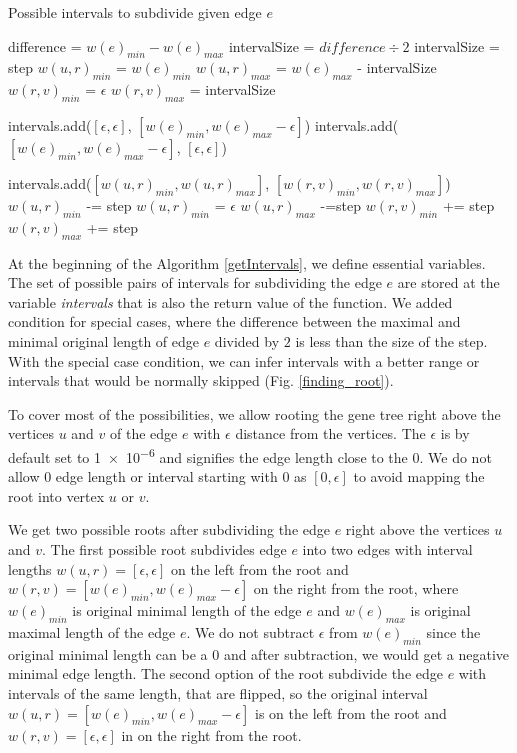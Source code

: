 \begin{algorithm}
\caption{Possible intervals to subdivide given edge $e$} 
\label{getIntervals}
\begin{algorithmic}[1]
	\State difference = $w(e)_{min} - w(e)_{max}$
		\State intervalSize = $difference \div 2$
	\Else
		\State intervalSize = step
	\EndIf
	\State $w(u,r)_{min}$ = $w(e)_{min}$
	\State $w(u,r)_{max}$ = $w(e)_{max}$ - intervalSize
	\State $w(r,v)_{min}$ = $\epsilon$
	\State $w(r,v)_{max}$ = intervalSize
	
	\State intervals.add($[ \epsilon, \epsilon ]$, $[ w(e)_{min}, w(e)_{max}-\epsilon ]$) 
	\State intervals.add($[ w(e)_{min}, w(e)_{max}-\epsilon ]$, $[ \epsilon, \epsilon ]$)
	
		\State intervals.add($[w(u,r)_{min}, w(u,r)_{max}]$, $[w(r,v)_{min},w(r,v)_{max}]$)
		\State $w(u,r)_{min}$ -= step
			\State $w(u,r)_{min}$ = $\epsilon$
		\EndIf
		\State $w(u,r)_{max}$ -=step
		\State $w(r,v)_{min}$ += step
		\State $w(r,v)_{max}$ += step
	\EndWhile
	\EndIf
\EndFunction
\end{algorithmic}
\end{algorithm}

At the beginning of the Algorithm \ref{getIntervals}, we define essential variables. The set of possible pairs of intervals for subdividing the edge $e$ are stored at the variable \emph{intervals} that is also the return value of the function. We added condition for special cases, where the difference between the maximal and minimal original length of edge $e$ divided by $2$ is less than the size of the step. With the special case condition, we can infer intervals with a better range or intervals that would be normally skipped (Fig. \ref{finding_root}).

To cover most of the possibilities, we allow rooting the gene tree right above the vertices $u$ and $v$ of the edge $e$ with $\epsilon$ distance from the vertices. The $\epsilon$ is by default set to \num{1e-6} and signifies the edge length close to the $0$. We do not allow $0$ edge length or interval starting with $0$ as $[0, \epsilon]$ to avoid mapping the root into vertex $u$ or $v$.

We get two possible roots after subdividing the edge $e$ right above the vertices $u$ and $v$. The first possible root subdivides edge $e$ into two edges with interval lengths $w(u, r) = [ \epsilon, \epsilon ]$ on the left from the root and $w(r, v) = [ w(e)_{min}, w(e)_{max}-\epsilon ]$ on the right from the root, where $w(e)_{min}$ is original minimal length of the edge $e$ and $w(e)_{max}$ is original maximal length of the edge $e$. We do not subtract $\epsilon$ from $w(e)_{min}$ since the original minimal length can be a $0$ and after subtraction, we would get a negative minimal edge length. The second option of the root subdivide the edge $e$ with intervals of the same length, that are flipped, so the original interval $w(u, r) = [ w(e)_{min}, w(e)_{max}-\epsilon ]$ is on the left from the root and $w(r, v) = [ \epsilon, \epsilon ]$ in on the right from the root.

